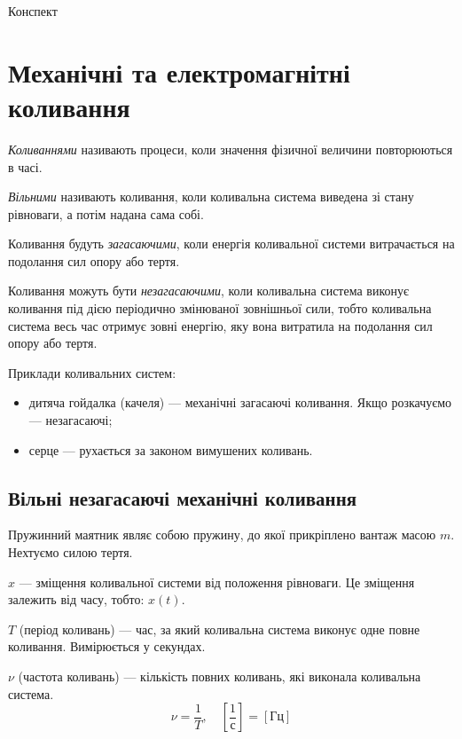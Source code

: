 \documentclass[a4paper,oneside,12pt,DIV=9,titlepage,toc]{scrartcl}
\begin{document}
	\begin{titlepage}
		\begin{center}
			Конспект
		\end{center}
	\end{titlepage}
	
	\tableofcontents
	
	\section{Механічні та електромагнітні коливання}
		\emph{Коливаннями} називають процеси, коли значення фізичної величини повторюються в часі.
		
		\emph{Вільними} називають коливання, коли коливальна система виведена зі стану рівноваги, а потім надана сама собі.
		
		Коливання будуть \emph{загасаючими}, коли енергія коливальної системи витрачається на подолання сил опору або тертя.
		
		Коливання можуть бути \emph{незагасаючими}, коли коливальна система виконує коливання під дією періодично змінюваної зовнішньої сили, тобто коливальна система весь час отримує зовні енергію, яку вона витратила на подолання сил опору або тертя.
		
		Приклади коливальних систем:
		\begin{itemize}
			\item дитяча гойдалка (качеля) --- механічні загасаючі коливання. Якщо розкачуємо --- незагасаючі;
			\item серце --- рухається за законом вимушених коливань.
		\end{itemize}
		
		\subsection{Вільні незагасаючі механічні коливання}
			Пружинний маятник являє собою пружину, до якої прикріплено вантаж масою $m$. Нехтуємо силою тертя.
			
			$x$ --- зміщення коливальної системи від положення рівноваги. Це зміщення залежить від часу, тобто: $x(t)$.
			
			$T$ (період коливань) --- час, за який коливальна система виконує одне повне коливання. Вимірюється у секундах.
			
			$\nu$ (частота коливань) --- кількість повних коливань, які виконала коливальна система.
			\[
				\nu = \frac{1}{T}, \quad
				\left[ \frac{1}{\textrm{с}} \right] =  \left[ \textrm{Гц} \right]
			\]
			
\end{document}

